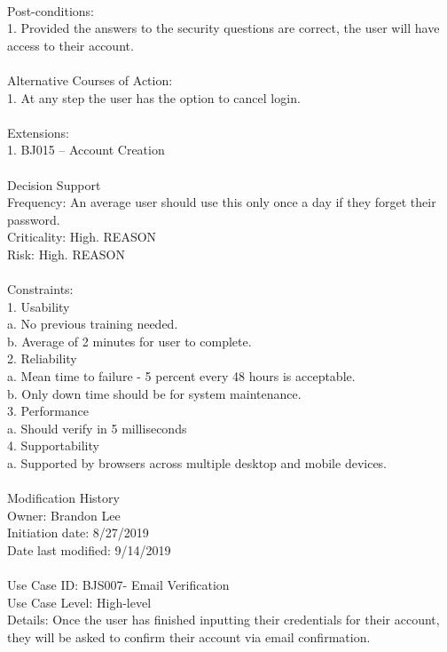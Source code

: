 \documentclass{report}
\begin{document}
\\
Post-conditions: \\
1.	Provided the answers to the security questions are correct, the user will have access to their account.\\
\\
Alternative Courses of Action:\\
1.	At any step the user has the option to cancel login.\\
\\
Extensions: \\
1.	BJ015 – Account Creation\\
\\
Decision Support\\
     Frequency: An average user should use this only once a day if they forget their password.\\
     Criticality: High. REASON\\
     Risk: High. REASON\\
\\
Constraints: \\
1.	Usability\\
a.	No previous training needed.\\
b.	Average of 2 minutes for user to complete.\\
2.	Reliability\\
a.	Mean time to failure - 5 percent every 48 hours is acceptable.\\
b.	Only down time should be for system maintenance.\\
3.	Performance\\
a.	Should verify in 5 milliseconds\\
4.	Supportability\\
a. 	Supported by browsers across multiple desktop and mobile devices.\\
\\
Modification History\\
     Owner: Brandon Lee\\
     Initiation date: 8/27/2019\\
     Date last modified: 9/14/2019\\
\\
Use Case ID: BJS007- Email Verification\\
Use Case Level: High-level\\
Details:  Once the user has finished inputting their credentials for their account, they will be asked to confirm their account via email confirmation.\\
\end{document}
